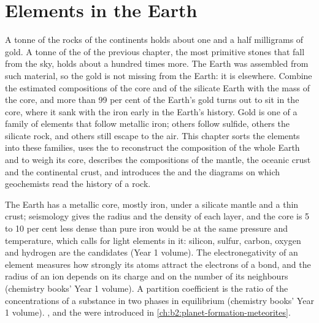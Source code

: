 \chapter{Elements in the Earth}\label{ch:b2:elements-in-the-earth}

A tonne of the rocks of the continents holds about one and a half milligrams of
gold. A tonne of the  of the previous chapter, the most
primitive stones that fall from the sky, holds about a hundred times more. The
Earth was assembled from such material, so the gold is not missing from the
Earth: it is elsewhere. Combine the estimated compositions of the core and of
the silicate Earth with the mass of the core, and more than 99 per cent of the
Earth's gold turns out to sit in the core, where it sank with the iron early in
the Earth's history. Gold is one of a family of elements that follow metallic
iron; others follow sulfide, others the silicate rock, and others still escape
to the air. This chapter sorts the elements into these families, uses the
 to reconstruct the composition of the whole Earth and to weigh its
core, describes the compositions of the mantle, the oceanic crust and the
continental crust, and introduces the  and the diagrams on which
geochemists read the history of a rock.

\begin{recall}
The Earth has a metallic core, mostly iron, under a silicate mantle and a thin
crust; seismology gives the radius and the density of each layer, and the core
is 5 to 10 per cent less dense than pure iron would be at the same pressure and
temperature, which calls for light elements in it: silicon, sulfur, carbon,
oxygen and hydrogen are the candidates (Year 1 volume). The
electronegativity of an element measures how strongly its atoms attract the
electrons of a bond, and the radius of an ion depends on its charge and on the
number of its neighbours (chemistry books' Year 1 volume). A partition
coefficient is the ratio of the concentrations of a substance in two phases in
equilibrium (chemistry books' Year 1 volume). ,  and the  were introduced in
\cref{ch:b2:planet-formation-meteorites}.
\end{recall}

